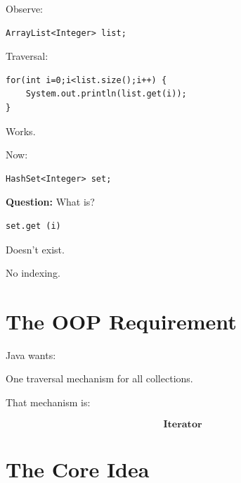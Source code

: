 \documentclass[11pt,a4paper]{book}
\newcommand{\question}[1]{
\vspace{0.5em}
\textbf{Question:} #1?
\vspace{0.2em}
}
\begin{document}
Observe:

\begin{verbatim} 
ArrayList<Integer> list;
\end{verbatim}

Traversal:

\begin{verbatim} 
for(int i=0;i<list.size();i++) {
    System.out.println(list.get(i));
}
\end{verbatim}


Works.


Now:

\begin{verbatim} 
HashSet<Integer> set;
\end{verbatim}

\question{What is}
\begin{verbatim}
set.get (i)
\end{verbatim}



Doesn't exist.


No indexing.


\section{The OOP Requirement}

Java wants:


One traversal mechanism
for all collections.


That mechanism is:

\[
\textbf{Iterator}
\]


\section{The Core Idea}
\end{document}
